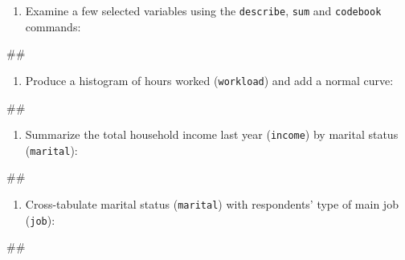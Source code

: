 \documentclass[
]{book}
\newenvironment{Shaded}{\begin{snugshade}}{\end{snugshade}}
\newcommand{\NormalTok}[1]{#1}
\providecommand{\tightlist}{%
  \setlength{\itemsep}{0pt}\setlength{\parskip}{0pt}}
\begin{document}
\begin{enumerate}
\def\labelenumi{\arabic{enumi}.}
\setcounter{enumi}{1}
\tightlist
\item
  Examine a few selected variables using the \texttt{describe}, \texttt{sum} and \texttt{codebook} commands:
\end{enumerate}

\begin{Shaded}
\begin{Highlighting}[]
\NormalTok{\#\#}
\end{Highlighting}
\end{Shaded}

\begin{enumerate}
\def\labelenumi{\arabic{enumi}.}
\setcounter{enumi}{2}
\tightlist
\item
  Produce a histogram of hours worked (\texttt{workload}) and add a normal curve:
\end{enumerate}

\begin{Shaded}
\begin{Highlighting}[]
\NormalTok{\#\#}
\end{Highlighting}
\end{Shaded}

\begin{enumerate}
\def\labelenumi{\arabic{enumi}.}
\setcounter{enumi}{3}
\tightlist
\item
  Summarize the total household income last year (\texttt{income}) by marital status (\texttt{marital}):
\end{enumerate}

\begin{Shaded}
\begin{Highlighting}[]
\NormalTok{\#\#}
\end{Highlighting}
\end{Shaded}

\begin{enumerate}
\def\labelenumi{\arabic{enumi}.}
\setcounter{enumi}{4}
\tightlist
\item
  Cross-tabulate marital status (\texttt{marital}) with respondents' type of main job (\texttt{job}):
\end{enumerate}

\begin{Shaded}
\begin{Highlighting}[]
\NormalTok{\#\#}
\end{Highlighting}
\end{Shaded}
\end{document}
